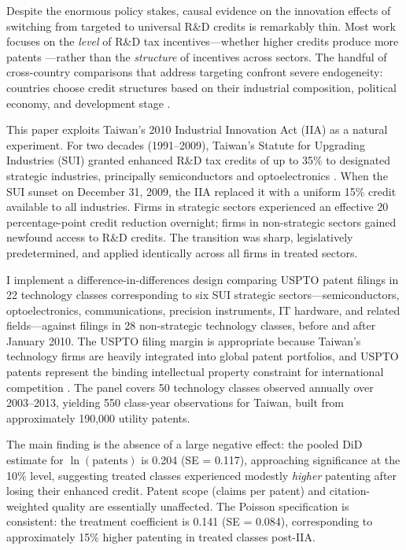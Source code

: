 \documentclass[12pt]{article}
\begin{document}
Despite the enormous policy stakes, causal evidence on the innovation effects of switching from targeted to universal R\&D credits is remarkably thin. Most work focuses on the \textit{level} of R\&D tax incentives---whether higher credits produce more patents \citep{bloom2002patents, dechezlepretre2016tax}---rather than the \textit{structure} of incentives across sectors. The handful of cross-country comparisons that address targeting confront severe endogeneity: countries choose credit structures based on their industrial composition, political economy, and development stage \citep{chen2021evaluating}.

This paper exploits Taiwan's 2010 Industrial Innovation Act (IIA) as a natural experiment. For two decades (1991--2009), Taiwan's Statute for Upgrading Industries (SUI) granted enhanced R\&D tax credits of up to 35\% to designated strategic industries, principally semiconductors and optoelectronics \citep{chen2006taiwan}. When the SUI sunset on December 31, 2009, the IIA replaced it with a uniform 15\% credit available to all industries. Firms in strategic sectors experienced an effective 20 percentage-point credit reduction overnight; firms in non-strategic sectors gained newfound access to R\&D credits. The transition was sharp, legislatively predetermined, and applied identically across all firms in treated sectors.

I implement a difference-in-differences design comparing USPTO patent filings in 22 technology classes corresponding to six SUI strategic sectors---semiconductors, optoelectronics, communications, precision instruments, IT hardware, and related fields---against filings in 28 non-strategic technology classes, before and after January 2010. The USPTO filing margin is appropriate because Taiwan's technology firms are heavily integrated into global patent portfolios, and USPTO patents represent the binding intellectual property constraint for international competition \citep{hu2005returns}. The panel covers 50 technology classes observed annually over 2003--2013, yielding 550 class-year observations for Taiwan, built from approximately 190,000 utility patents.

The main finding is the absence of a large negative effect: the pooled DiD estimate for $\ln(\text{patents})$ is 0.204 (SE = 0.117), approaching significance at the 10\% level, suggesting treated classes experienced modestly \textit{higher} patenting after losing their enhanced credit. Patent scope (claims per patent) and citation-weighted quality are essentially unaffected. The Poisson specification is consistent: the treatment coefficient is 0.141 (SE = 0.084), corresponding to approximately 15\% higher patenting in treated classes post-IIA.
\end{document}
